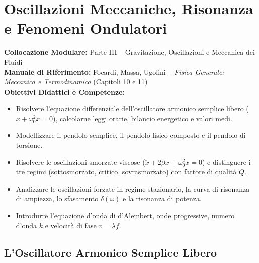 \chapter{Oscillazioni Meccaniche, Risonanza e Fenomeni Ondulatori}
\label{chap:oscillazioni_onde}

\begin{tcolorbox}[enhanced, breakable, colback=navyblue!4!white, colframe=navyblue!80!black,
    coltitle=white, fonttitle=\bfseries\sffamily, title={Quadro Sinottico del Capitolo 10},
    sharp corners, rounded corners=south, boxrule=1pt]
\textbf{Collocazione Modulare:} Parte III -- Gravitazione, Oscillazioni e Meccanica dei Fluidi\\
\textbf{Manuale di Riferimento:} Focardi, Massa, Ugolini -- \emph{Fisica Generale: Meccanica e Termodinamica} (Capitoli 10 e 11)\\
\textbf{Obiettivi Didattici e Competenze:}\par
\begin{itemize}
    \item Risolvere l'equazione differenziale dell'oscillatore armonico semplice libero ($\ddot{x} + \omega_0^2 x = 0$), calcolarne leggi orarie, bilancio energetico e valori medi.
    \item Modellizzare il pendolo semplice, il pendolo fisico composto e il pendolo di torsione.
    \item Risolvere le oscillazioni smorzate viscose ($\ddot{x} + 2\beta\dot{x} + \omega_0^2 x = 0$) e distinguere i tre regimi (sottosmorzato, critico, sovrasmorzato) con fattore di qualità $Q$.
    \item Analizzare le oscillazioni forzate in regime stazionario, la curva di risonanza di ampiezza, lo sfasamento $\delta(\omega)$ e la risonanza di potenza.
    \item Introdurre l'equazione d'onda di d'Alembert, onde progressive, numero d'onda $k$ e velocità di fase $v = \lambda f$.
\end{itemize}
\end{tcolorbox}

\vspace{0.5em}

\section{L'Oscillatore Armonico Semplice Libero}
\label{sec:oscillatore_armonico_semplice}

